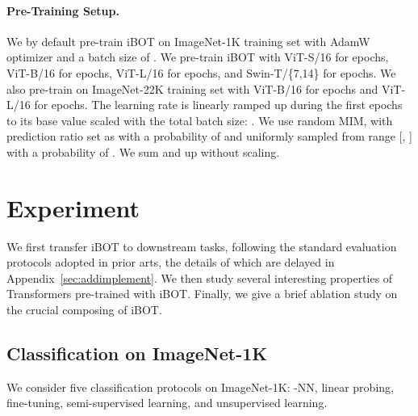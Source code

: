 \documentclass{article} \usepackage{iclr2022_conference,times}
\def\ourmethod{{iBOT}\xspace}
\begin{document}
\paragraph{Pre-Training Setup.} 
We by default pre-train \ourmethod on ImageNet-1K \citep{imagenet} training set with AdamW \citep{adamw} optimizer and a batch size of . We pre-train \ourmethod with ViT-S/16 for  epochs, ViT-B/16 for  epochs, ViT-L/16 for  epochs, and Swin-T/\{7,14\} for  epochs.
We also pre-train on ImageNet-22K training set with ViT-B/16 for  epochs and ViT-L/16 for  epochs.
The learning rate is linearly ramped up during the first  epochs to its base value scaled with the total batch size: .
We use random MIM, with prediction ratio  set as  with a probability of  and uniformly sampled from range [, ] with a probability of .
We sum  and  up without scaling.




\section{Experiment}
\label{sec:exp}

We first transfer \ourmethod to downstream tasks, following the standard evaluation protocols adopted in prior arts, the details of which are delayed in Appendix~\ref{sec:addimplement}.
We then study several interesting properties of Transformers pre-trained with \ourmethod. 
Finally, we give a brief ablation study on the crucial composing of \ourmethod.

\subsection{Classification on ImageNet-1K}
\label{sec:imagenet}

We consider five classification protocols on ImageNet-1K: -NN, linear probing, fine-tuning, semi-supervised learning, and unsupervised learning.
\end{document}
